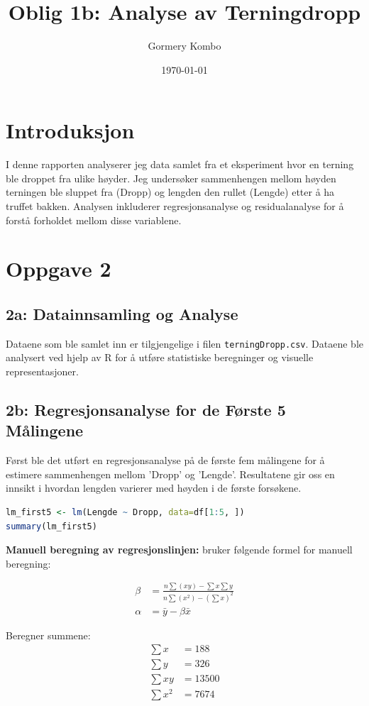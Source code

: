 \documentclass{article}
\title{Oblig 1b: Analyse av Terningdropp}
\author{Gormery Kombo}
\date{\today}
\begin{document}
\maketitle

\section{Introduksjon}
I denne rapporten analyserer jeg data samlet fra et eksperiment hvor en terning ble droppet fra ulike høyder. Jeg undersøker sammenhengen mellom høyden terningen ble sluppet fra (Dropp) og lengden den rullet (Lengde) etter å ha truffet bakken. Analysen inkluderer regresjonsanalyse og residualanalyse for å forstå forholdet mellom disse variablene.

\section{Oppgave 2}
\subsection{2a: Datainnsamling og Analyse}
Dataene som ble samlet inn er tilgjengelige i filen \texttt{terningDropp.csv}. Dataene ble analysert ved hjelp av R for å utføre statistiske beregninger og visuelle representasjoner.

\subsection{2b: Regresjonsanalyse for de Første 5 Målingene}
Først ble det utført en regresjonsanalyse på de første fem målingene for å estimere sammenhengen mellom 'Dropp' og 'Lengde'. Resultatene gir oss en innsikt i hvordan lengden varierer med høyden i de første forsøkene.

\begin{lstlisting}[language=R]
lm_first5 <- lm(Lengde ~ Dropp, data=df[1:5, ])
summary(lm_first5)
\end{lstlisting}
\textbf{Manuell beregning av regresjonslinjen:} 
bruker følgende formel for manuell beregning:

\begin{align*}
\beta &= \frac{n\sum(xy) - \sum x \sum y}{n\sum(x^2) - (\sum x)^2} \\
\alpha &= \bar{y} - \beta\bar{x}
\end{align*}

Beregner summene:
\begin{align*}
\sum x &= 188 \\
\sum y &= 326 \\
\sum xy &= 13500 \\
\sum x^2 &= 7674
\end{align*}
\end{document}
